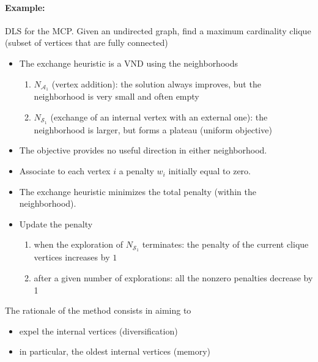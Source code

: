 \documentclass[11pt]{article}
\begin{document}
	\newpage
	
	\paragraph{Example:} DLS for the MCP. Given an undirected graph, find a maximum cardinality clique (subset of vertices that are fully connected)
	\begin{itemize}
		\item The exchange heuristic is a VND using the neighborhoods
		\begin{enumerate}
			\item $N_{\mathcal{A}_1}$ (vertex addition): the solution always improves, but the neighborhood is very small and often empty
			
			\item $N_{\mathcal{S}_1}$ (exchange of an internal vertex with an external one): the neighborhood is larger, but forms a plateau (uniform objective)
		\end{enumerate}
		\nn
		
		\item The objective provides no useful direction in either neighborhood.\\
		
		\item Associate to each vertex $i$ a penalty $w_i$ initially equal to zero.\\
		
		\item The exchange heuristic minimizes the total penalty (within the neighborhood).\\
		
		\item Update the penalty
		\begin{enumerate}
			\item when the exploration of $N_{\mathcal{S}_1}$ terminates: the penalty of the current clique vertices increases by $1$
			
			\item after a given number of explorations: all the nonzero penalties decrease by 1
		\end{enumerate}
		\nn
	\end{itemize}
	
	The rationale of the method consists in aiming to
	\begin{itemize}
		\item expel the internal vertices (diversification)
		\item in particular, the oldest internal vertices (memory)
	\end{itemize}
	
\end{document}
